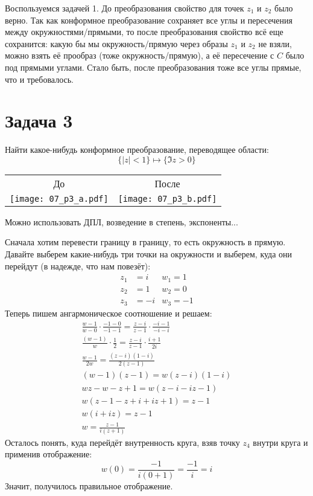 	Воспользуемся задачей 1.
	До преобразования свойство для точек $z_1$ и $z_2$ было верно.
	Так как конформное преобразование сохраняет все углы и пересечения между окружностями/прямыми, то
	после преобразования свойство всё еще сохранится: какую бы мы окружность/прямую через образы
	$z_1$ и $z_2$ не взяли, можно взять её прообраз (тоже окружность/прямую), а её пересечение с $C$
	было под прямыми углами.
	Стало быть, после преобразования тоже все углы прямые, что и требовалось.

\section{Задача 3}
	Найти какое-нибудь конформное преобразование, переводящее области:
	\[ \{ |z|<1 \} \mapsto \{ \Im z > 0 \} \]
	\begin{center}
		\begin{tabular}{cc}
		До & После \\
		\texttt{[image: 07\_p3\_a.pdf]} & \texttt{[image: 07\_p3\_b.pdf]} \\
		\end{tabular}
	\end{center}
	Можно использовать ДПЛ, возведение в степень, экспоненты...

	Сначала хотим перевести границу в границу, то есть окружность в прямую.
	Давайте выберем какие-нибудь три точки на окружности и выберем, куда они перейдут
	(в надежде, что нам повезёт):
	\begin{align*}
		z_1 &= i & w_1 = 1 \\
		z_2 &= 1 & w_2 = 0 \\
		z_3 &= -i & w_3 = -1
	\end{align*}
	Теперь пишем ангармоническое соотношение и решаем:
	\begin{gather*}
		\frac{w-1}{w-0} \cdot \frac{-1-0}{-1-1} = \frac{z-i}{z-1} \cdot \frac{-i-1}{-i-i} \\
		\frac{(w-1)}{w} \cdot \frac 12 = \frac{z-i}{z-1} \cdot \frac{i+1}{2i} \\
		\frac{w-1}{2w} = \frac{(z-i)(1-i)}{2(z-1)} \\
		(w-1)(z-1) = w(z-i)(1-i) \\
		wz-w-z+1 = w(z-i-iz-1) \\
		w(z-1-z+i+iz+1) = z-1 \\
		w(i+iz) = z-1 \\
		w=\frac{z-1}{i(z+1)}
	\end{gather*}
	Осталось понять, куда перейдёт внутренность круга, взяв точку $z_4$ внутри круга и применив отображение:
	\[ w(0) = \frac{-1}{i(0+1)} = \frac{-1}{i} = i \]
	Значит, получилось правильное отображение.

